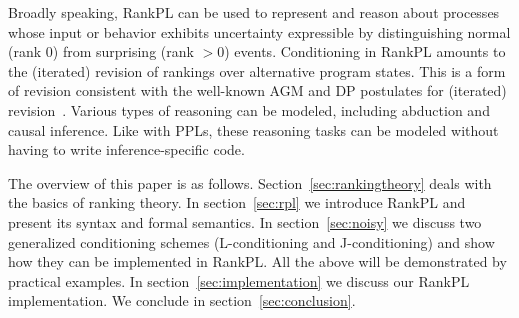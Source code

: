 \documentclass{llncs}
\begin{document}
Broadly speaking, RankPL can be used to represent and reason about processes
	whose input or behavior exhibits uncertainty expressible %
	by distinguishing normal (rank $0$) from surprising (rank $> 0$) events.
Conditioning in RankPL amounts to the (iterated) revision of rankings over alternative program states.
This is a form of revision consistent with the well-known AGM and DP postulates for (iterated) revision~\cite{DBLP:dblp_journals/ai/DarwicheP97,Gardenfors:1995:BR:216136.216138}.
Various types of reasoning can be modeled, including abduction and causal inference.
Like with PPLs, these reasoning tasks can be modeled without having to write inference-specific code.

The overview of this paper is as follows.
Section~\ref{sec:rankingtheory} deals with the basics of ranking theory.
In section~\ref{sec:rpl} we introduce RankPL and present its syntax and formal semantics.
In section~\ref{sec:noisy} we discuss two generalized conditioning schemes (L-conditioning and J-conditioning) and show how they can be implemented in RankPL.
All the above will be demonstrated by practical examples.
In section~\ref{sec:implementation} we discuss our RankPL implementation.
We conclude in section~\ref{sec:conclusion}.

\end{document}

